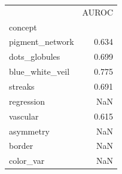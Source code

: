 \begin{tabular}{lr}
\toprule
 & AUROC \\
concept &  \\
\midrule
pigment_network & 0.634 \\
dots_globules & 0.699 \\
blue_white_veil & 0.775 \\
streaks & 0.691 \\
regression & NaN \\
vascular & 0.615 \\
asymmetry & NaN \\
border & NaN \\
color_var & NaN \\
\bottomrule
\end{tabular}
